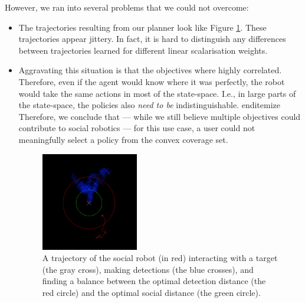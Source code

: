 \documentclass[a4paper,11pt]{report}
\begin{document}
However, we ran into several problems that we could not overcome: 
\begin{itemize}
\item The trajectories resulting from our planner look like Figure \ref{fig:motraj}. These trajectories appear jittery. In fact, it is hard to distinguish any differences between trajectories learned for different linear scalarisation weights. 
\item Aggravating this situation is that the objectives where highly correlated. Therefore, even if the agent would know where it was perfectly, the robot would take the same actions in most of the state-space. I.e., in large parts of the state-space, the policies also \emph{need to be} indistinguishable. 
end{itemize}
Therefore, we conclude that --- while we still believe multiple objectives could contribute to social robotics --- for this use case, a user could not meaningfully select a policy from the convex coverage set. 
\begin{figure}
\centering
\includegraphics[width=0.4\textwidth]{motrajectory.png}
\caption{A trajectory of the social robot (in red) interacting with a target (the gray 
cross), making detections (the blue crosses), and finding a balance between the optimal 
detection distance (the red circle) and the optimal social distance (the green circle).}
\label{fig:motraj}
\end{figure}
\end{itemize}
\end{document}
